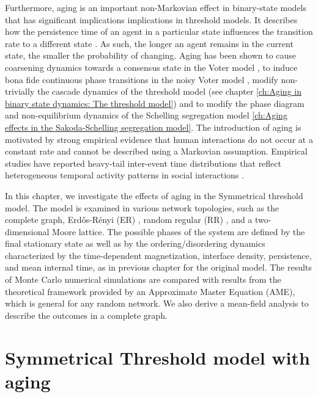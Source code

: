 Furthermore, aging is an important non-Markovian effect in binary-state models that has significant implications implications in threshold models. It describes how the persistence time of an agent in a particular state influences the transition rate to a different state \cite{stark-2008, fernandez-gracia-2011, perez-2016, boguna-2014, chen-2020}. As such, the longer an agent remains in the current state, the smaller the probability of changing. Aging has been shown to cause coarsening dynamics towards a consensus state in the Voter model \cite{fernandez-gracia-2011,peralta-2020C}, to induce bona fide continuous phase transitions in the noisy Voter model \cite{artime-2018,peralta-2020A}, modify non-trivially the cascade dynamics of the threshold model (see chapter \ref{ch:Aging in binary state dynamics: The threshold model}) and to modify the phase diagram and non-equilibrium dynamics of the Schelling segregation model \ref{ch:Aging effects in the Sakoda-Schelling segregation model}. The introduction of aging is motivated by strong empirical evidence that human interactions do not occur at a constant rate and cannot be described using a Markovian assumption. Empirical studies have reported heavy-tail inter-event time distributions that reflect heterogeneous temporal activity patterns in social interactions \cite{karsai-2011, rybski-2009, zignani-2016, artime-2017, kumar-2020}.
	
In this chapter, we investigate the effects of aging in the Symmetrical threshold model. The model is examined in various network topologies, such as the complete graph, Erd\H{o}s-Rényi (ER)  \cite{erdos1960evolution}, random regular (RR) \cite{wormald1999models}, and a two-dimensional Moore lattice. The possible phases of the system are defined by the final stationary state as well as by the ordering/disordering dynamics characterized by the time-dependent magnetization, interface density, persistence, and mean internal time, as in previous chapter for the original model. The results of Monte Carlo numerical simulations are compared with results from the theoretical framework provided by an Approximate Master Equation (AME), which is general for any random network. We also derive a mean-field analysis to describe the outcomes in a complete graph.
	
\section{\label{Symmetrical Threshold model with aging} Symmetrical Threshold model with aging}
	
